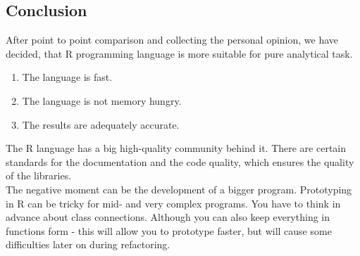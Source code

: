\documentclass{article}
\begin{document}
\subsection{Conclusion}
After point to point comparison and collecting the personal opinion, we have decided, that R programming language is more suitable for pure analytical task.
\begin{enumerate}
    \item The language is fast.
    \item The language is not memory hungry.
    \item The results are adequately accurate. 
\end{enumerate}
The R language has a big high-quality community behind it. There are certain standards for the documentation and the code quality, which ensures the quality of the libraries.\\
The negative moment can be the development of a bigger program. Prototyping in R can be tricky for mid- and very complex programs. You have to think in advance about class connections. Although you can also keep everything in functions form - this will allow you to prototype faster, but will cause some difficulties later on during refactoring.\\
  

\newpage
\end{document}
